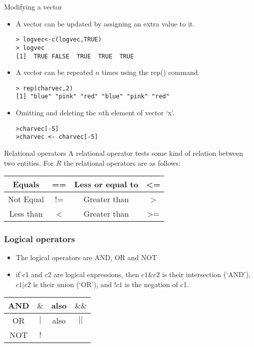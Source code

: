 \documentclass{beamer}
\begin{document}
\begin{frame}[fragile]{Modifying a vector}

\begin{itemize}
\item A vector can be updated by assigning an extra value to it.
\begin{verbatim}
> logvec<-c(logvec,TRUE)
> logvec
[1]  TRUE FALSE  TRUE  TRUE  TRUE
\end{verbatim}

\item A vector can be repeated $n$ times using the rep() command.
\begin{verbatim}
> rep(charvec,2)
[1] "blue" "pink" "red" "blue" "pink" "red"
\end{verbatim}

\item Omitting and deleting the $n$th element of vector `x'.
\begin{verbatim}
>charvec[-5]
>charvec <- charvec[-5]
\end{verbatim}

\end{itemize}
\end{frame}
\begin{frame}[fragile]{Relational operators}
A relational operator tests some kind of relation between two
entities. For $R$ the relational operators are as follows:
\begin{center}
\begin{tabular}{|c|c|c|c|}
  \hline

  Equals & == & Less or equal to  & <= \\
  \hline
  Not Equal & != & Greater than & > \\
  \hline
  Less than & < & Greater than & >= \\
  \hline
\end{tabular}
\end{center}
\end{frame}
\begin{frame}[fragile]
\frametitle{Logical operators}
\begin{itemize}
\item The logical operators are AND, OR and NOT

\item if c1 and c2 are logical expressions, then $c1 \& c2$ is
their intersection (`AND'), $c1 | c2$ is their union (`OR'), and
$!c1$ is the negation of c1.
\end{itemize}
\begin{center}
\begin{tabular}{|c|c|c|c|}
  \hline
  AND & $ \& $ & also  & $\&\&$ \\
  \hline
  OR & $|$ & also & $||$ \\
  \hline
  NOT & $!$ & &  \\
  \hline
\end{tabular}
\end{center}
\end{frame}
\end{document}
